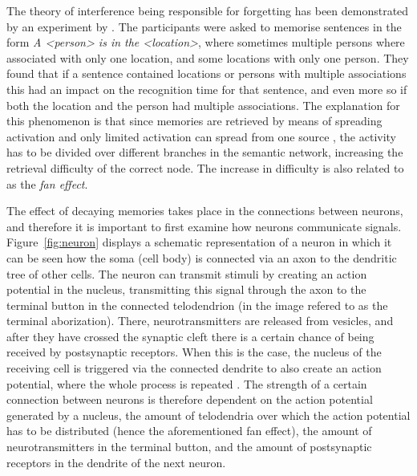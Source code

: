 The theory of interference being responsible for forgetting has been demonstrated by an experiment by . The participants were asked to memorise sentences in the form \emph{A \textless person\textgreater{} is in the \textless location\textgreater}, where sometimes multiple persons where associated with only one location, and some locations with only one person. They found that if a sentence contained locations or persons with multiple associations this had an impact on the recognition time for that sentence, and even more so if both the location and the person had multiple associations. The explanation for this phenomenon is that since memories are retrieved by means of spreading activation and only limited activation can spread from one source \cite{cognitivepsychology}, the activity has to be divided over different branches in the semantic network, increasing the retrieval difficulty of the correct node. The increase in difficulty is also related to as the \emph{fan effect}.

The effect of decaying memories takes place in the connections between neurons, and therefore it is important to first examine how neurons communicate signals. Figure~\ref{fig:neuron} displays a schematic representation of a neuron in which it can be seen how the soma (cell body) is connected via an axon to the dendritic tree of other cells. The neuron can transmit stimuli by creating an action potential in the nucleus, transmitting this signal through the axon to the terminal button in the connected telodendrion (in the image refered to as the terminal aborization). There, neurotransmitters are released from vesicles, and after they have crossed the synaptic cleft there is a certain chance of being received by postsynaptic receptors. When this is the case, the nucleus of the receiving cell is triggered via the connected dendrite to also create an action potential, where the whole process is repeated \cite{longtermpotentiation}. The strength of a certain connection between neurons is therefore dependent on the action potential generated by a nucleus, the amount of telodendria over which the action potential has to be distributed (hence the aforementioned fan effect), the amount of neurotransmitters in the terminal button, and the amount of postsynaptic receptors in the dendrite of the next neuron.

